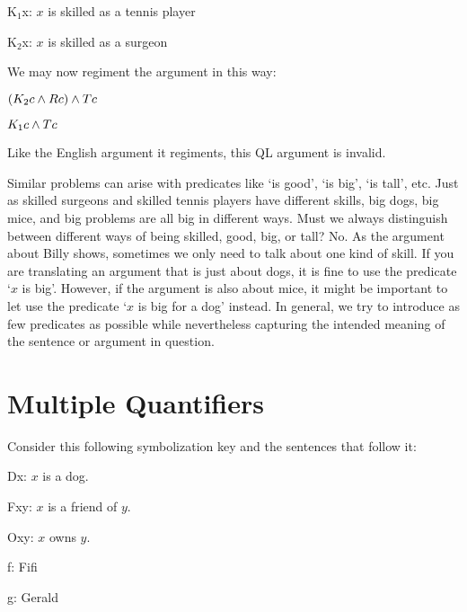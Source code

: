 \begin{ekey}
  \item[K$_1$x:] $x$ is skilled as a tennis player
  \item[K$_2$x:] $x$ is skilled as a surgeon
\end{ekey}

We may now regiment the argument in this way:

\begin{earg}
\label{surgeon3correct}
\item[] $(K_2c \wedge Rc) \wedge Tc$
\item[\therefore] $K_1c \wedge Tc$
\end{earg}

Like the English argument it regiments, this QL argument is invalid. 

Similar problems can arise with predicates like `is good', `is big', `is tall', etc.
Just as skilled surgeons and skilled tennis players have different skills, big dogs, big mice, and big problems are all big in different ways.
Must we always distinguish between different ways of being skilled, good, big, or tall? 
No.
As the argument about Billy shows, sometimes we only need to talk about one kind of skill.
If you are translating an argument that is just about dogs, it is fine to use the predicate `$x$ is big'.
However, if the argument is also about mice, it might be important to let use the predicate `$x$ is big for a dog' instead.
In general, we try to introduce as few predicates as possible while nevertheless capturing the intended meaning of the sentence or argument in question.






\section{Multiple Quantifiers}

Consider this following symbolization key and the sentences that follow it:

\begin{ekey}
\item{Dx:} $x$ is a dog.
\item{Fxy:} $x$ is a friend of $y$.
\item{Oxy:} $x$ owns $y$.
\item{f:} Fifi
\item{g:} Gerald
\end{ekey}

